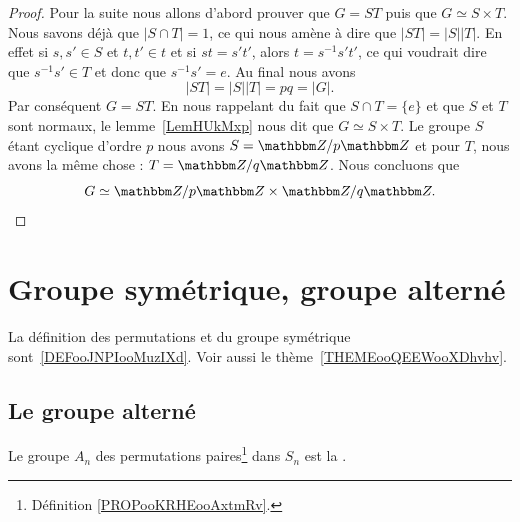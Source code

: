 \begin{proof}
    Pour la suite nous allons d'abord prouver que \( G=ST\) puis que \( G\simeq S\times T\). Nous savons déjà que \( | S\cap T |=1\), ce qui nous amène à dire que \( | ST |=| S | |T |\). En effet si \( s,s'\in S\) et \( t,t'\in t\) et si \( st=s't'\), alors \( t=s^{-1}s't'\), ce qui voudrait dire que \( s^{-1}s'\in T\) et donc que \( s^{-1}s'=e\). Au final nous avons
    \begin{equation}
        | ST |=| S | |T |=pq=| G |.
    \end{equation}
    Par conséquent \( G=ST\). En nous rappelant du fait que \( S\cap T=\{ e \}\) et que \( S\) et \( T\) sont normaux, le lemme~\ref{LemHUkMxp} nous dit que \( G\simeq S\times T\). Le groupe \( S\) étant cyclique d'ordre \( p\) nous avons \( S=\eZ/p\eZ\) et pour \( T\), nous avons la même chose : \( T=\eZ/q\eZ\). Nous concluons que
    \begin{equation}
        G\simeq \eZ/p\eZ\times \eZ/q\eZ.
    \end{equation}
\end{proof}


\section{Groupe symétrique, groupe alterné}
\label{SECooZFYQooFfopMa}

La définition des permutations et du groupe symétrique sont~\ref{DEFooJNPIooMuzIXd}. Voir aussi le thème~\ref{THEMEooQEEWooXDhvhv}.

\subsection{Le groupe alterné}

\begin{definition}      \label{DEFooEIVIooFvVkHH}
    Le groupe \( A_n\) des permutations paires\footnote{Définition \ref{PROPooKRHEooAxtmRv}.} dans \( S_n\) est la .
\end{definition}

